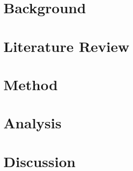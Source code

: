 \documentclass[10pt, a4paper, titlepage, draft]{report}
\begin{document}
\section*{Background}


\section*{Literature Review}


\section*{Method}


\section*{Analysis}


\section*{Discussion}

\end{document}
